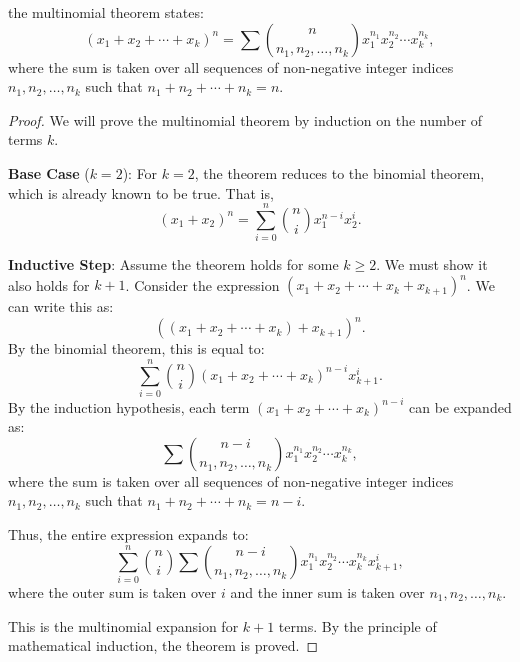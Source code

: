         \begin{solution}
                the multinomial theorem states:
                \[
                (x_1 + x_2 + \cdots + x_k)^n = \sum \binom{n}{n_1, n_2, \ldots, n_k} x_1^{n_1} x_2^{n_2} \cdots x_k^{n_k},
                \]
                where the sum is taken over all sequences of non-negative integer indices $n_1, n_2, \ldots, n_k$ such that $n_1 + n_2 + \cdots + n_k = n$.
                
            \begin{proof}
                We will prove the multinomial theorem by induction on the number of terms $k$.
                
                \textbf{Base Case} ($k=2$):
                For $k=2$, the theorem reduces to the binomial theorem, which is already known to be true. That is,
                \[
                (x_1 + x_2)^n = \sum_{i=0}^{n} \binom{n}{i} x_1^{n-i} x_2^i.
                \]
                
                \textbf{Inductive Step}:
                Assume the theorem holds for some $k \geq 2$. We must show it also holds for $k+1$. Consider the expression $(x_1 + x_2 + \cdots + x_k + x_{k+1})^n$. We can write this as:
                \[
                \left((x_1 + x_2 + \cdots + x_k) + x_{k+1}\right)^n.
                \]
                By the binomial theorem, this is equal to:
                \[
                \sum_{i=0}^{n} \binom{n}{i} (x_1 + x_2 + \cdots + x_k)^{n-i} x_{k+1}^i.
                \]
                By the induction hypothesis, each term $(x_1 + x_2 + \cdots + x_k)^{n-i}$ can be expanded as:
                \[
                \sum \binom{n-i}{n_1, n_2, \ldots, n_k} x_1^{n_1} x_2^{n_2} \cdots x_k^{n_k},
                \]
                where the sum is taken over all sequences of non-negative integer indices $n_1, n_2, \ldots, n_k$ such that $n_1 + n_2 + \cdots + n_k = n-i$.
                
                Thus, the entire expression expands to:
                \[
                \sum_{i=0}^{n} \binom{n}{i} \sum \binom{n-i}{n_1, n_2, \ldots, n_k} x_1^{n_1} x_2^{n_2} \cdots x_k^{n_k} x_{k+1}^i,
                \]
                where the outer sum is taken over $i$ and the inner sum is taken over $n_1, n_2, \ldots, n_k$.
                
                This is the multinomial expansion for $k+1$ terms. By the principle of mathematical induction, the theorem is proved.
            \end{proof}
        \end{solution}




















